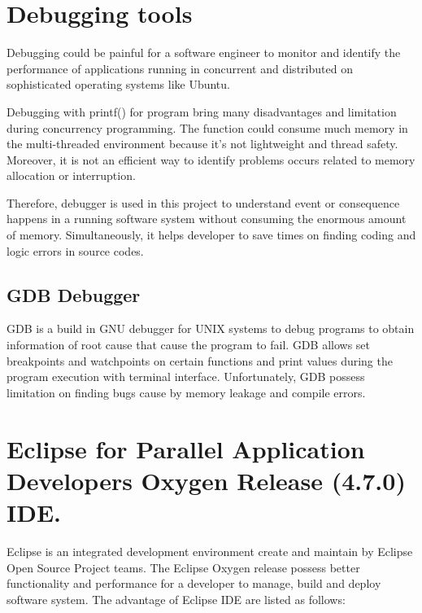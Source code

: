 \section{Debugging tools}

Debugging could be painful for a software engineer to monitor and identify the performance of applications running in concurrent and distributed on sophisticated operating systems like Ubuntu. 

Debugging with printf() for program bring many disadvantages and limitation during concurrency programming. The function could consume much memory in the multi-threaded environment because it’s not lightweight and thread safety. \cite{printf-bad} Moreover, it is not an efficient way to identify problems occurs related to memory allocation or interruption.

Therefore, debugger is used in this project to understand event or consequence happens in a running software system without consuming the enormous amount of memory. Simultaneously, it helps developer to save times on finding coding and logic errors in source codes.  \cite{what-is-tracing} 

\subsection{GDB Debugger}

GDB is a build in GNU debugger for UNIX systems to debug programs to obtain information of root cause that cause the program to fail. \cite{what-is-debugger} GDB allows set breakpoints and watchpoints on certain functions and print values during the program execution with terminal interface. Unfortunately, GDB possess limitation on finding bugs cause by memory leakage and compile errors.

\section{Eclipse for Parallel Application Developers Oxygen Release (4.7.0) IDE.} 

Eclipse is an integrated development environment create and maintain by Eclipse Open Source Project teams. The Eclipse Oxygen release possess better functionality and performance for a developer to manage, build and deploy software system. The advantage of Eclipse IDE are listed as follows: 

